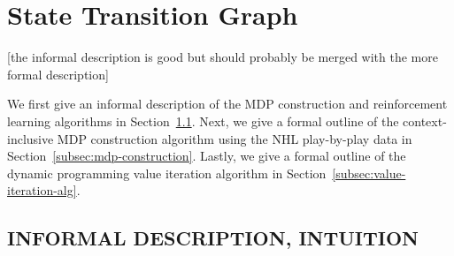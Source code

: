 \documentclass[]{article}
\begin{document}
\section{State Transition Graph}

[the informal description is good but should probably be merged with the more formal description]

\label{sec:algorithms}


We first give an informal description of the MDP construction and reinforcement learning algorithms in Section~\ref{subsec:informal-description}. Next, we give a formal outline of the context-inclusive MDP construction algorithm using the NHL play-by-play data in Section~\ref{subsec:mdp-construction}. Lastly, we give a formal outline of the dynamic programming value iteration algorithm in Section~\ref{subsec:value-iteration-alg}.


\subsection{INFORMAL DESCRIPTION, INTUITION}
\label{subsec:informal-description}
\end{document}
